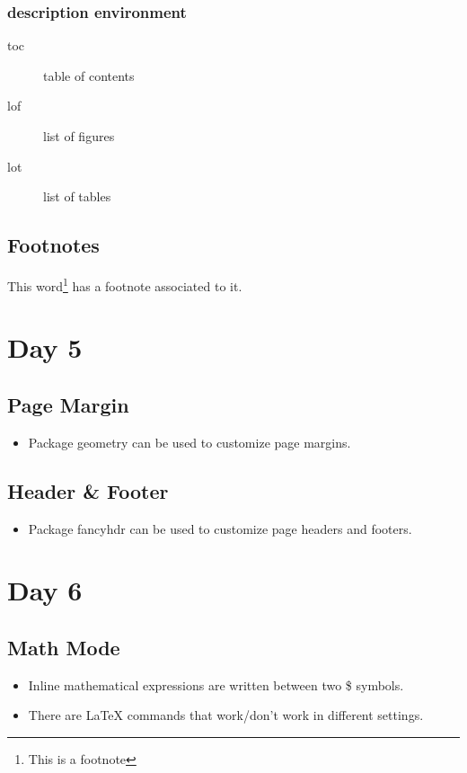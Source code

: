 \documentclass[a4paper,12pt]{article}
\begin{document}
\subsubsection*{description environment}
	\begin{description}
		\item[toc] table of contents
		\item[lof] list of figures
		\item[lot] list of tables
	\end{description}

\subsection{Footnotes}
This word\footnote{This is a footnote} has a footnote associated to it.

\section{Day 5}

\subsection{Page Margin}
\begin{itemize}
	\item Package geometry can be used to customize page margins.
\end{itemize}

\subsection{Header \& Footer}
\begin{itemize}
	\item Package fancyhdr can be used to customize page headers and footers.
\end{itemize}

\section{Day 6}

\subsection{Math Mode}
\begin{itemize}
	\item Inline mathematical expressions are written between two \$ symbols.
	\item There are \LaTeX{} commands that work/don't work in different settings.
\end{itemize}
\end{document}
